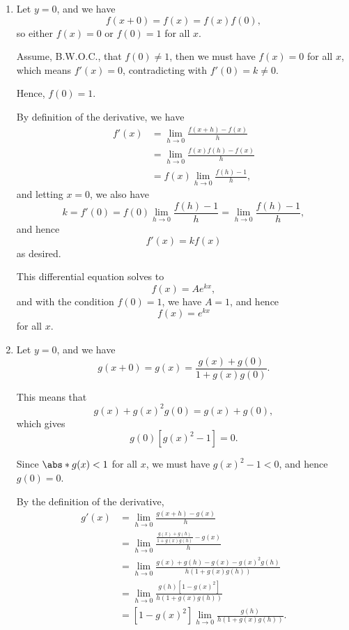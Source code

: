 \Question{\currfilebase}

\begin{enumerate}
    \item Let \(y = 0\), and we have
          \[
              f(x + 0) = f(x) = f(x) f(0),
          \]
          so either \(f(x) = 0\) or \(f(0) = 1\) for all \(x\).

          Assume, B.W.O.C., that \(f(0) \neq 1\), then we must have \(f(x) = 0\) for all \(x\), which means \(f'(x) = 0\), contradicting with \(f'(0) = k \neq 0\).

          Hence, \(f(0) = 1\).

          By definition of the derivative, we have
          \begin{align*}
              f'(x) & = \lim_{h \to 0} \frac{f(x + h) - f(x)}{h}  \\
                    & = \lim_{h \to 0} \frac{f(x) f(h) - f(x)}{h} \\
                    & = f(x) \lim_{h \to 0} \frac{f(h) - 1}{h},
          \end{align*}
          and letting \(x = 0\), we also have
          \[
              k = f'(0) = f(0) \lim_{h \to 0} \frac{f(h) - 1}{h} = \lim_{h \to 0} \frac{f(h) - 1}{h},
          \]
          and hence
          \[
              f'(x) = k f(x)
          \]
          as desired.

          This differential equation solves to
          \[
              f(x) = A e^{kx},
          \]
          and with the condition \(f(0) = 1\), we have \(A = 1\), and hence
          \[
              f(x) = e^{kx}
          \]
          for all \(x\).

    \item Let \(y = 0\), and we have
          \[
              g(x + 0) = g(x) = \frac{g(x) + g(0)}{1 + g(x) g(0)}.
          \]

          This means that
          \[
              g(x) + g(x)^2 g(0) = g(x) + g(0),
          \]
          which gives
          \[
              g(0) \left[g(x)^2 - 1\right] = 0.
          \]

          Since \(\abs*{g(x)} < 1\) for all \(x\), we must have \(g(x)^2 - 1 < 0\), and hence \(g(0) = 0\).

          By the definition of the derivative,
          \begin{align*}
              g'(x) & = \lim_{h \to 0} \frac{g(x + h) - g(x)}{h}                                  \\
                    & = \lim_{h \to 0} \frac{\frac{g(x) + g(h)}{1 + g(x) g(h)} - g(x)}{h}         \\
                    & = \lim_{h \to 0} \frac{g(x) + g(h) - g(x) - g(x)^2 g(h)}{h (1 + g(x) g(h))} \\
                    & = \lim_{h \to 0} \frac{g(h) \left[1 - g(x)^2\right]}{h (1 + g(x) g(h))}     \\
                    & = \left[1 - g(x)^2\right] \lim_{h \to 0} \frac{g(h)}{h (1 + g(x) g(h))}.
          \end{align*}


\end{enumerate}
